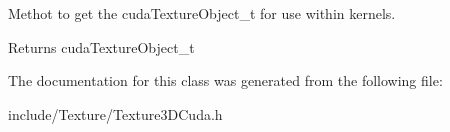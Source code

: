 Methot to get the cuda\+Texture\+Object\+\_\+t for use within kernels. 

\begin{DoxyReturn}{Returns}
cuda\+Texture\+Object\+\_\+t 
\end{DoxyReturn}


The documentation for this class was generated from the following file\+:\begin{DoxyCompactItemize}
\item 
include/\+Texture/Texture3\+D\+Cuda.\+h\end{DoxyCompactItemize}
